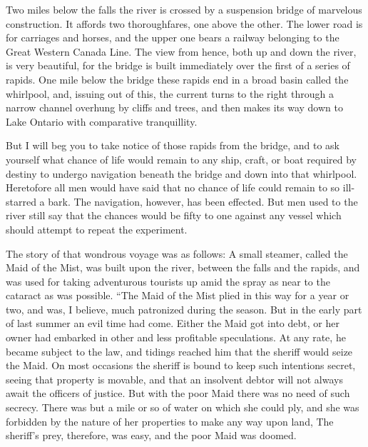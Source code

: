 Two miles below the falls the river is crossed by a suspension
bridge of marvelous construction.  It affords two thoroughfares,
one above the other.  The lower road is for carriages and horses,
and the upper one bears a railway belonging to the Great Western
Canada Line.  The view from hence, both up and down the river, is
very beautiful, for the bridge is built immediately over the first
of a series of rapids.  One mile below the bridge these rapids end
in a broad basin called the whirlpool, and, issuing out of this,
the current turns to the right through a narrow channel overhung by
cliffs and trees, and then makes its way down to Lake Ontario with
comparative tranquillity.

But I will beg you to take notice of those rapids from the bridge,
and to ask yourself what chance of life would remain to any ship,
craft, or boat required by destiny to undergo navigation beneath
the bridge and down into that whirlpool.  Heretofore all men would
have said that no chance of life could remain to so ill-starred a
bark.  The navigation, however, has been effected.  But men used to
the river still say that the chances would be fifty to one against
any vessel which should attempt to repeat the experiment.

The story of that wondrous voyage was as follows:  A small steamer,
called the Maid of the Mist, was built upon the river, between the
falls and the rapids, and was used for taking adventurous tourists
up amid the spray as near to the cataract as was possible.  ``The
Maid of the Mist plied in this way for a year or two, and was, I
believe, much patronized during the season.  But in the early part
of last summer an evil time had come.  Either the Maid got into
debt, or her owner had embarked in other and less profitable
speculations.  At any rate, he became subject to the law, and
tidings reached him that the sheriff would seize the Maid.  On most
occasions the sheriff is bound to keep such intentions secret,
seeing that property is movable, and that an insolvent debtor will
not always await the officers of justice.  But with the poor Maid
there was no need of such secrecy.  There was but a mile or so of
water on which she could ply, and she was forbidden by the nature
of her properties to make any way upon land, The sheriff's prey,
therefore, was easy, and the poor Maid was doomed.

